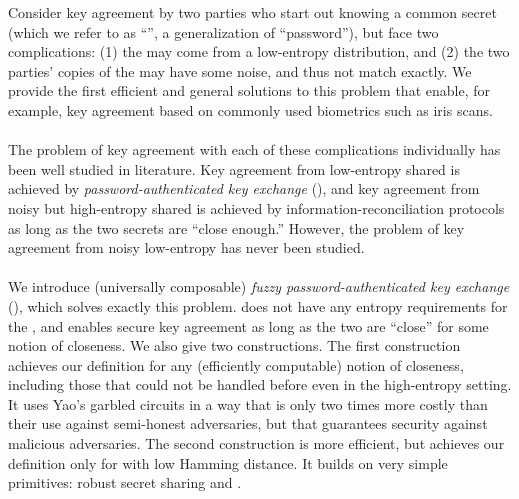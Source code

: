  
Consider key agreement by two parties who start out knowing a common secret (which we refer to as ``\password'', a generalization of ``password''),
but face two complications: 
(1) the \password may come from a low-entropy distribution, and 
(2) the two parties' copies of the \password may have some noise, and thus not match exactly.
We provide the first efficient and general solutions to this problem that enable, for example, key agreement based on commonly used biometrics such as iris scans.\\
\\
The problem of key agreement with each of these complications individually has been well studied in literature.
Key agreement from low-entropy shared \passwords is achieved by \emph{password-authenticated key exchange} (\PAKE), and 
key agreement from noisy but high-entropy shared \passwords is achieved by information-reconciliation protocols as long as the two secrets are ``close enough.''
However, the problem of key agreement from noisy low-entropy \passwords has never been studied.\\
\\
We introduce (universally composable) \emph{fuzzy password-authenticated key exchange} (\FAKE), which solves exactly this problem.
\FAKE does not have any entropy requirements for the \passwords, and enables secure key agreement as long as the two \passwords are ``close'' for some notion of closeness.
We also give two constructions. 
The first construction achieves our \FAKE definition for any (efficiently computable) notion of closeness, including those that could not be handled before even in the high-entropy setting.
It uses Yao's garbled circuits in a way that is only two times more costly than their use against semi-honest adversaries, but that guarantees security against malicious adversaries.
The second construction is more efficient, but achieves our \FAKE definition only for \passwords with low Hamming distance.
It builds on very simple primitives: robust secret sharing and \PAKE.
